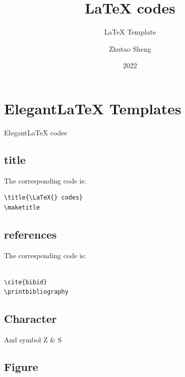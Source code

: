\documentclass[11pt]{elegantbook}
\title{\LaTeX{} codes}
\subtitle{\LaTeX{} Template}
\author{Zhutao Sheng}
\date{2022}
\begin{document}
\maketitle

\frontmatter
\tableofcontents

\mainmatter

\chapter{Elegant\LaTeX{} Templates}
Elegant\LaTeX{} codes

\section{title}
The corresponding code is: 
\begin{lstlisting}
\title{\LaTeX{} codes}
\maketitle
\end{lstlisting}


\section{references}
The corresponding code is: 
\begin{lstlisting}

\cite{bibid}
\printbibliography
\end{lstlisting}

\section{Character}
And symbol Z \& S

\section{Figure}
\end{document}
